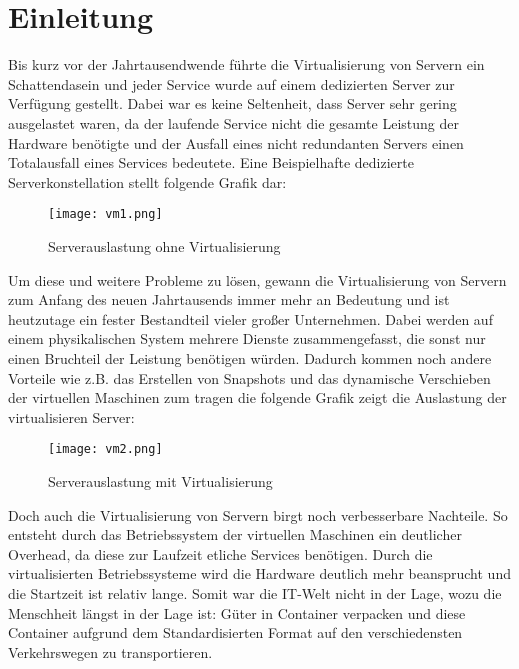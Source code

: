 \section{Einleitung}
\label{sec:Einleitung}

Bis kurz vor der Jahrtausendwende führte die Virtualisierung von Servern ein Schattendasein und jeder Service wurde auf einem dedizierten Server zur Verfügung gestellt. Dabei war es keine Seltenheit, dass Server sehr gering ausgelastet waren, da der laufende Service nicht die gesamte Leistung der Hardware benötigte und der Ausfall eines nicht redundanten Servers einen Totalausfall eines Services bedeutete. Eine Beispielhafte dedizierte Serverkonstellation stellt folgende Grafik dar:
\begin{figure}[H]
	\begin{center}
		\texttt{[image: vm1.png]}
	\end{center}
	\caption[Serverauslastung ohne Virtualisierung]{Serverauslastung ohne Virtualisierung \footnotemark}
	\label{fig:HW1}
\end{figure}
\newpage
Um diese und weitere Probleme zu lösen, gewann die Virtualisierung von Servern zum Anfang des neuen Jahrtausends immer mehr an Bedeutung und ist heutzutage ein fester Bestandteil vieler großer Unternehmen. Dabei werden auf einem physikalischen System mehrere Dienste zusammengefasst, die sonst nur einen Bruchteil der Leistung benötigen würden. Dadurch kommen noch andere Vorteile wie z.B. das Erstellen von Snapshots und das dynamische Verschieben der virtuellen Maschinen zum tragen die folgende Grafik zeigt die Auslastung der virtualisieren Server:
\begin{figure}[H]
	\begin{center}
		\texttt{[image: vm2.png]}
	\end{center}
	\caption[Serverauslastung mit Virtualisierung]{Serverauslastung mit Virtualisierung \footnotemark}
	\label{fig:HW2}
\end{figure}
\newpage
Doch auch die Virtualisierung von Servern birgt noch verbesserbare Nachteile. So entsteht durch das Betriebssystem der virtuellen Maschinen ein deutlicher Overhead, da diese zur Laufzeit etliche Services benötigen. Durch die virtualisierten Betriebssysteme wird die Hardware deutlich mehr beansprucht und die Startzeit ist relativ lange. Somit war die IT-Welt nicht in der Lage, wozu die Menschheit längst in der Lage ist: Güter in Container verpacken und diese Container aufgrund dem Standardisierten Format auf den verschiedensten Verkehrswegen zu transportieren.
